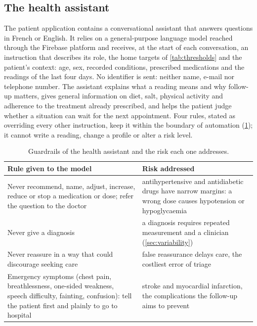 \documentclass[11pt,a4paper,oneside]{report}
\begin{document}
\subsection{The health assistant}\label{sec:assistant}

The patient application contains a conversational assistant that answers questions in French or English. It relies on a general-purpose language model reached through the Firebase platform and receives, at the start of each conversation, an instruction that describes its role, the home targets of \cref{tab:thresholds} and the patient's context: age, sex, recorded conditions, prescribed medications and the readings of the last four days. No identifier is sent: neither name, e-mail nor telephone number. The assistant explains what a reading means and why follow-up matters, gives general information on diet, salt, physical activity and adherence to the treatment already prescribed, and helps the patient judge whether a situation can wait for the next appointment. Four rules, stated as overriding every other instruction, keep it within the boundary of automation (\cref{tab:assistant-guardrails}); it cannot write a reading, change a profile or alter a risk level.

\begin{table}[htbp]
\centering\footnotesize
\caption{Guardrails of the health assistant and the risk each one addresses.}\label{tab:assistant-guardrails}
\begin{tabularx}{\textwidth}{@{}>{\raggedright\arraybackslash}p{5.6cm} X@{}}
\toprule
\textbf{Rule given to the model} & \textbf{Risk addressed} \\
\midrule
Never recommend, name, adjust, increase, reduce or stop a medication or dose; refer the question to the doctor & antihypertensive and antidiabetic drugs have narrow margins: a wrong dose causes hypotension or hypoglycaemia \\
Never give a diagnosis & a diagnosis requires repeated measurement and a clinician (\cref{sec:variability}) \\
Never reassure in a way that could discourage seeking care & false reassurance delays care, the costliest error of triage \\
Emergency symptoms (chest pain, breathlessness, one-sided weakness, speech difficulty, fainting, confusion): tell the patient first and plainly to go to hospital & stroke and myocardial infarction, the complications the follow-up aims to prevent \\
\bottomrule
\end{tabularx}
\end{table}
\end{document}

